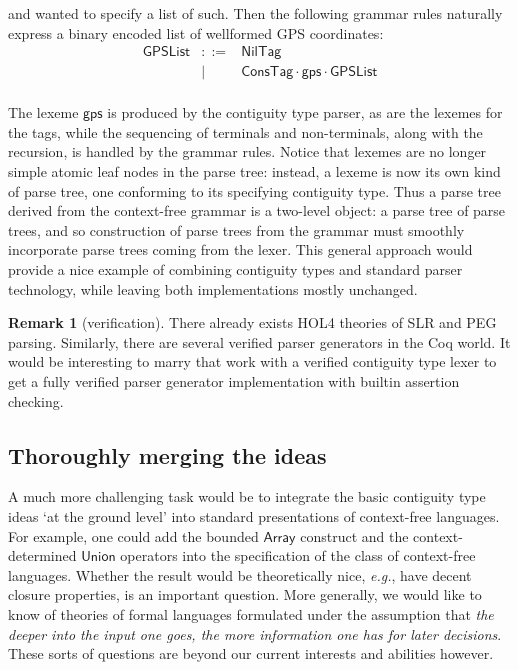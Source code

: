 \documentclass{article}
\newcommand{\eg}{\textit{e.g.}}
\newcommand{\konst}[1]{\ensuremath{\mathsf{#1}}}
\theoremstyle{definition}
\newtheorem{remark}{Remark}
\begin{document}
and wanted to specify a list of such. Then the following grammar rules
naturally express a binary encoded list of wellformed GPS
coordinates:
\[
\begin{array}{rcl}
 \konst{GPSList} & ::=  & \konst{NilTag} \\
                 & \mid & \konst{ConsTag} \cdot \konst{gps} \cdot \konst{GPSList} \\
\end{array}
\]

The lexeme \konst{gps} is produced by the contiguity type parser, as
are the lexemes for the tags, while the sequencing of terminals and
non-terminals, along with the recursion, is handled by the grammar
rules. Notice that lexemes are no longer simple atomic leaf nodes in
the parse tree: instead, a lexeme is now its own kind of parse tree,
one conforming to its specifying contiguity type. Thus a parse tree
derived from the context-free grammar is a two-level object: a parse
tree of parse trees, and so construction of parse trees from the
grammar must smoothly incorporate parse trees coming from the
lexer. This general approach would provide a nice example of combining
contiguity types and standard parser technology, while leaving both
implementations mostly unchanged.

\begin{remark} [verification] There already exists
  HOL4 theories of SLR and PEG parsing. Similarly, there are several
  verified parser generators in the Coq world. It would be interesting
  to marry that work with a verified contiguity type lexer to get a
  fully verified parser generator implementation with builtin
  assertion checking.
\end{remark}

\subsection{Thoroughly merging the ideas}

A much more challenging task would be to integrate the basic
contiguity type ideas `at the ground level' into standard
presentations of context-free languages. For example, one could add
the bounded \konst{Array} construct and the context-determined
\konst{Union} operators into the specification of the class of
context-free languages. Whether the result would be theoretically
nice, \eg, have decent closure properties, is an important
question. More generally, we would like to know of theories of formal
languages formulated under the assumption that \emph{the deeper into
  the input one goes, the more information one has for later
  decisions}. These sorts of questions are beyond our current
interests and abilities however.
\end{document}
